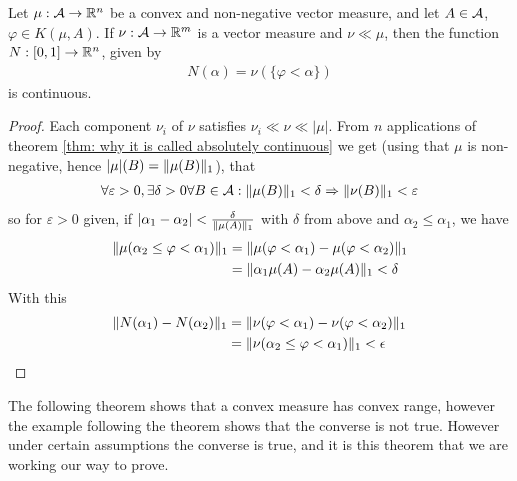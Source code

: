 \documentclass[../../main.tex]{subfiles}
\begin{document}
\begin{lemma}\label{lem: continuous map from measure}
Let $\mu : \m{A} \to \R^{n}$ be a convex and non-negative vector measure, and let $A \in \m{A}$, $\varphi \in K(\mu, A)$. If $\nu: \m{A} \to \R^{m}$ is a vector measure and $\nu \ll \mu$, then the function $N:[0,1] \to \R^{n}$, given by
\begin{align*}
	N(\alpha) = \nu(\{\varphi < \alpha\})
\end{align*}
is continuous.
\end{lemma}
\begin{proof}
Each component $\nu_{i}$ of $\nu$ satisfies $\nu_{i}\ll \nu \ll |\mu|$. From $n$ applications of theorem \cref{thm: why it is called absolutely continuous} we get (using that $\mu$ is non-negative, hence $|\mu|(B)=\norm[1]{\mu(B)}$), that
\begin{align*}
	\forall \varepsilon > 0, \exists \delta > 0 \forall B\in \m{A}: \norm[1]{\mu(B)} < \delta \Rightarrow \norm[1]{\nu(B)} < \varepsilon
\end{align*}
so for $\varepsilon > 0$ given, if $|\alpha_{1}-\alpha_{2}| < \frac{\delta}{\norm[1]{\mu(A)}}$ with $\delta$ from above and $\alpha_{2}\le \alpha_{1}$, we have
\begin{align*}
	\norm[1]{\mu(\alpha_{2} \le \varphi < \alpha_{1} )} &= \norm[1]{ \mu(\varphi < \alpha_{1}) - \mu(\varphi < \alpha_{2}) } \\
	& = \norm[1]{ \alpha_{1}\mu(A) - \alpha_{2}\mu(A) } < \delta
\end{align*}
With this
\begin{align*}
	\norm[1]{N(\alpha_{1})-N(\alpha_{2})} &= \norm[1]{ \nu(\varphi < \alpha_{1}) - \nu(\varphi< \alpha_{2}) } \\
	&= \norm[1]{ \nu(\alpha_{2} \le \varphi < \alpha_{1}) } < \epsilon
\end{align*}
\end{proof}


The following theorem shows that a convex measure has convex range, however the example following the theorem shows that the converse is not true. However under certain assumptions the converse is true, and it is this theorem that we are working our way to prove.
\end{document}
